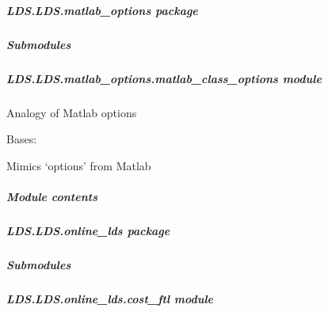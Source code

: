 \documentclass[letterpaper,10pt,english]{sphinxmanual}
\begin{document}
\subparagraph{LDS.LDS.matlab\_options package}
\label{\detokenize{LDS.LDS.matlab_options:lds-lds-matlab-options-package}}\label{\detokenize{LDS.LDS.matlab_options::doc}}

\subparagraph{Submodules}
\label{\detokenize{LDS.LDS.matlab_options:submodules}}

\subparagraph{LDS.LDS.matlab\_options.matlab\_class\_options module}
\label{\detokenize{LDS.LDS.matlab_options:module-LDS.LDS.matlab_options.matlab_class_options}}\label{\detokenize{LDS.LDS.matlab_options:lds-lds-matlab-options-matlab-class-options-module}}
\sphinxAtStartPar
Analogy of Matlab options

\begin{fulllineitems}
\label{\detokenize{LDS.LDS.matlab_options:LDS.LDS.matlab_options.matlab_class_options.ClassOptions}}
\sphinxAtStartPar
Bases: 

\sphinxAtStartPar
Mimics ‘options’ from Matlab

\end{fulllineitems}



\subparagraph{Module contents}
\label{\detokenize{LDS.LDS.matlab_options:module-LDS.LDS.matlab_options}}\label{\detokenize{LDS.LDS.matlab_options:module-contents}}

\subparagraph{LDS.LDS.online\_lds package}
\label{\detokenize{LDS.LDS.online_lds:lds-lds-online-lds-package}}\label{\detokenize{LDS.LDS.online_lds::doc}}

\subparagraph{Submodules}
\label{\detokenize{LDS.LDS.online_lds:submodules}}

\subparagraph{LDS.LDS.online\_lds.cost\_ftl module}
\label{\detokenize{LDS.LDS.online_lds:module-LDS.LDS.online_lds.cost_ftl}}\label{\detokenize{LDS.LDS.online_lds:lds-lds-online-lds-cost-ftl-module}}
\end{document}
